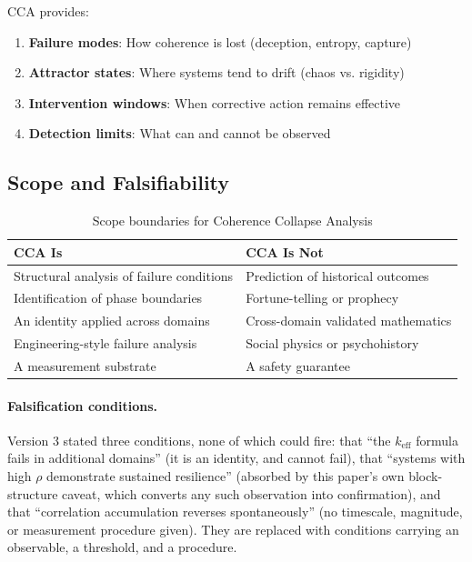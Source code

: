 \documentclass[11pt,a4paper]{article}
\theoremstyle{definition}
\theoremstyle{remark}
\newcommand{\keff}{k_{\text{eff}}}
\begin{document}
CCA provides:
\begin{enumerate}[noitemsep]
    \item \textbf{Failure modes}: How coherence is lost (deception, entropy, capture)
    \item \textbf{Attractor states}: Where systems tend to drift (chaos vs. rigidity)
    \item \textbf{Intervention windows}: When corrective action remains effective
    \item \textbf{Detection limits}: What can and cannot be observed
\end{enumerate}

\subsection{Scope and Falsifiability}

\begin{table}[H]
\centering
\begin{tabular}{>{\raggedright}p{} >{\raggedright\arraybackslash}p{}}
\toprule
\textbf{CCA Is} & \textbf{CCA Is Not} \\
\midrule
Structural analysis of failure conditions & Prediction of historical outcomes \\
Identification of phase boundaries & Fortune-telling or prophecy \\
An identity applied across domains & Cross-domain validated mathematics \\
Engineering-style failure analysis & Social physics or psychohistory \\
A measurement substrate & A safety guarantee \\
\bottomrule
\end{tabular}
\caption{Scope boundaries for Coherence Collapse Analysis}
\end{table}

\paragraph{Falsification conditions.}
Version 3 stated three conditions, none of which could fire: that ``the $\keff$ formula fails
in additional domains'' (it is an identity, and cannot fail), that ``systems with high $\rho$
demonstrate sustained resilience'' (absorbed by this paper's own block-structure caveat, which
converts any such observation into confirmation), and that ``correlation accumulation reverses
spontaneously'' (no timescale, magnitude, or measurement procedure given). They are replaced
with conditions carrying an observable, a threshold, and a procedure.
\end{document}
